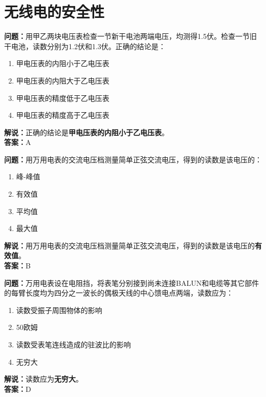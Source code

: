 \chapter{无线电的安全性}


\bigskip



\noindent\textbf{问题：}用甲乙两块电压表检查一节新干电池两端电压，均测得1.5伏。检查一节旧干电池，读数分别为1.2伏和1.3伏。正确的结论是：
\begin{enumerate}[label=\Alph*), leftmargin=3em]
	\item 甲电压表的内阻小于乙电压表
	\item 甲电压表的内阻大于乙电压表
	\item 甲电压表的精度低于乙电压表
	\item 甲电压表的精度高于乙电压表
\end{enumerate}
\noindent\textbf{解说：}正确的结论是\textbf{甲电压表的内阻小于乙电压表}。\\\noindent\textbf{答案：}A


\bigskip



\noindent\textbf{问题：}用万用电表的交流电压档测量简单正弦交流电压，得到的读数是该电压的：
\begin{enumerate}[label=\Alph*), leftmargin=3em]
	\item 峰-峰值
	\item 有效值
	\item 平均值
	\item 最大值
\end{enumerate}
\noindent\textbf{解说：}用万用电表的交流电压档测量简单正弦交流电压，得到的读数是该电压的\textbf{有效值}。\\\noindent\textbf{答案：}B


\bigskip



\noindent\textbf{问题：}万用电表设在电阻挡，将表笔分别接到尚未连接BALUN和电缆等其它部件的每臂长度均为四分之一波长的偶极天线的中心馈电点两端，读数应为：
\begin{enumerate}[label=\Alph*), leftmargin=3em]
	\item 读数受振子周围物体的影响
	\item 50欧姆
	\item 读数受表笔连线造成的驻波比的影响
	\item 无穷大
\end{enumerate}
\noindent\textbf{解说：}读数应为\textbf{无穷大}。\\\noindent\textbf{答案：}D


